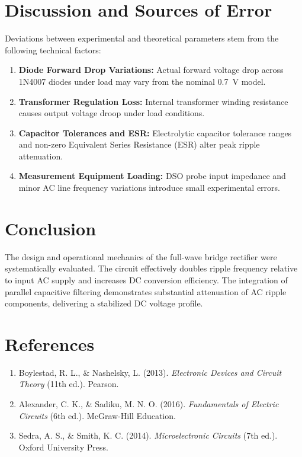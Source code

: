 \section{Discussion and Sources of Error}
Deviations between experimental and theoretical parameters stem from the following technical factors:
\begin{enumerate}
	\item \textbf{Diode Forward Drop Variations:} Actual forward voltage drop across 1N4007 diodes under load may vary from the nominal \qty{0.7}{\volt} model.
	\item \textbf{Transformer Regulation Loss:} Internal transformer winding resistance causes output voltage droop under load conditions.
	\item \textbf{Capacitor Tolerances and ESR:} Electrolytic capacitor tolerance ranges and non-zero Equivalent Series Resistance (ESR) alter peak ripple attenuation.
	\item \textbf{Measurement Equipment Loading:} DSO probe input impedance and minor AC line frequency variations introduce small experimental errors.
\end{enumerate}

\section{Conclusion}
The design and operational mechanics of the full-wave bridge rectifier were systematically evaluated. The circuit effectively doubles ripple frequency relative to input AC supply and increases DC conversion efficiency. The integration of parallel capacitive filtering demonstrates substantial attenuation of AC ripple components, delivering a stabilized DC voltage profile.

\section{References}
\begin{tcolorbox}[colback=gray!5, colframe=gray!40, arc=2mm]
	\begin{enumerate}
		\item Boylestad, R. L., \& Nashelsky, L. (2013). \textit{Electronic Devices and Circuit Theory} (11th ed.). Pearson.
		\item Alexander, C. K., \& Sadiku, M. N. O. (2016). \textit{Fundamentals of Electric Circuits} (6th ed.). McGraw-Hill Education.
		\item Sedra, A. S., \& Smith, K. C. (2014). \textit{Microelectronic Circuits} (7th ed.). Oxford University Press.
	\end{enumerate}
\end{tcolorbox}